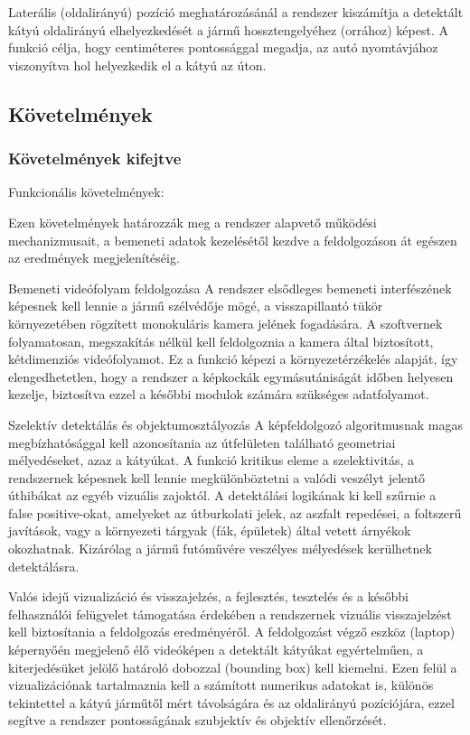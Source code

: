 Laterális (oldalirányú) pozíció meghatározásánál a rendszer kiszámítja a
detektált kátyú oldalirányú elhelyezkedését a jármű hossztengelyéhez
(orrához) képest. A funkció célja, hogy centiméteres pontossággal
megadja, az autó nyomtávjához viszonyítva hol helyezkedik el a kátyú az
úton.

\subsection{Követelmények}\label{kuxf6vetelmuxe9nyek}

\subsubsection{Követelmények
kifejtve}\label{kuxf6vetelmuxe9nyek-kifejtve}

Funkcionális követelmények:

Ezen követelmények határozzák meg a rendszer alapvető működési
mechanizmusait, a bemeneti adatok kezelésétől kezdve a feldolgozáson át
egészen az eredmények megjelenítéséig.

Bemeneti videófolyam feldolgozása A rendszer elsődleges bemeneti
interfészének képesnek kell lennie a jármű szélvédője mögé, a
visszapillantó tükör környezetében rögzített monokuláris kamera jelének
fogadására. A szoftvernek folyamatosan, megszakítás nélkül kell
feldolgoznia a kamera által biztosított, kétdimenziós videófolyamot. Ez
a funkció képezi a környezetérzékelés alapját, így elengedhetetlen, hogy
a rendszer a képkockák egymásutániságát időben helyesen kezelje,
biztosítva ezzel a későbbi modulok számára szükséges adatfolyamot.

Szelektív detektálás és objektumosztályozás A képfeldolgozó
algoritmusnak magas megbízhatósággal kell azonosítania az útfelületen
található geometriai mélyedéseket, azaz a kátyúkat. A funkció kritikus
eleme a szelektivitás, a rendszernek képesnek kell lennie
megkülönböztetni a valódi veszélyt jelentő úthibákat az egyéb vizuális
zajoktól. A detektálási logikának ki kell szűrnie a false positive-okat,
amelyeket az útburkolati jelek, az aszfalt repedései, a foltszerű
javítások, vagy a környezeti tárgyak (fák, épületek) által vetett
árnyékok okozhatnak. Kizárólag a jármű futóművére veszélyes mélyedések
kerülhetnek detektálásra.

Valós idejű vizualizáció és visszajelzés, a fejlesztés, tesztelés és a
későbbi felhasználói felügyelet támogatása érdekében a rendszernek
vizuális visszajelzést kell biztosítania a feldolgozás eredményéről. A
feldolgozást végző eszköz (laptop) képernyőén megjelenő élő videóképen a
detektált kátyúkat egyértelműen, a kiterjedésüket jelölő határoló
dobozzal (bounding box) kell kiemelni. Ezen felül a vizualizációnak
tartalmaznia kell a számított numerikus adatokat is, különös tekintettel
a kátyú járműtől mért távolságára és az oldalirányú pozíciójára, ezzel
segítve a rendszer pontosságának szubjektív és objektív ellenőrzését.

